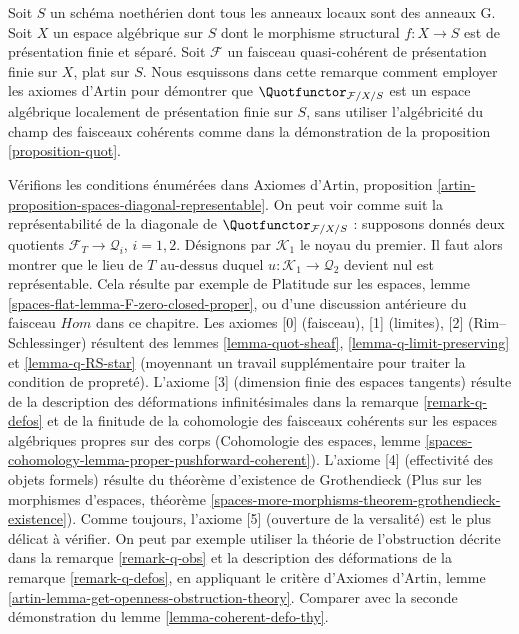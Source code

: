 \begin{remark}
\label{remark-quot-via-artins-axioms}
Soit $S$ un schéma noethérien dont tous les anneaux locaux sont des anneaux G.
Soit $X$ un espace algébrique sur $S$ dont le morphisme structural
$f : X \to S$ est de présentation finie et séparé. Soit $\mathcal{F}$ un
faisceau quasi-cohérent de présentation finie sur $X$, plat sur $S$. Nous
esquissons dans cette remarque comment employer les axiomes d'Artin pour
démontrer que $\Quotfunctor_{\mathcal{F}/X/S}$ est un espace algébrique
localement de présentation finie sur $S$, sans utiliser l'algébricité du champ
des faisceaux cohérents comme dans la démonstration de la proposition
\ref{proposition-quot}.

\medskip\noindent
Vérifions les conditions énumérées dans Axiomes d'Artin, proposition
\ref{artin-proposition-spaces-diagonal-representable}. On peut voir comme suit
la représentabilité de la diagonale de
$\Quotfunctor_{\mathcal{F}/X/S}$ : supposons donnés deux quotients
$\mathcal{F}_T \to \mathcal{Q}_i$, $i = 1, 2$. Désignons par
$\mathcal{K}_1$ le noyau du premier. Il faut alors montrer que le lieu de $T$
au-dessus duquel $u : \mathcal{K}_1 \to \mathcal{Q}_2$ devient nul est
représentable. Cela résulte par exemple de Platitude sur les espaces, lemme
\ref{spaces-flat-lemma-F-zero-closed-proper}, ou d'une discussion antérieure
du faisceau $\mathit{Hom}$ dans ce chapitre. Les axiomes [0] (faisceau), [1]
(limites), [2] (Rim--Schlessinger) résultent des lemmes
\ref{lemma-quot-sheaf}, \ref{lemma-q-limit-preserving} et
\ref{lemma-q-RS-star} (moyennant un travail supplémentaire pour traiter la
condition de propreté). L'axiome [3] (dimension finie des espaces tangents)
résulte de la description des déformations infinitésimales dans la remarque
\ref{remark-q-defos} et de la finitude de la cohomologie des faisceaux
cohérents sur les espaces algébriques propres sur des corps (Cohomologie des
espaces, lemme \ref{spaces-cohomology-lemma-proper-pushforward-coherent}).
L'axiome [4] (effectivité des objets formels) résulte du théorème d'existence
de Grothendieck (Plus sur les morphismes d'espaces, théorème
\ref{spaces-more-morphisms-theorem-grothendieck-existence}). Comme toujours,
l'axiome [5] (ouverture de la versalité) est le plus délicat à vérifier. On
peut par exemple utiliser la théorie de l'obstruction décrite dans la remarque
\ref{remark-q-obs} et la description des déformations de la remarque
\ref{remark-q-defos}, en appliquant le critère d'Axiomes d'Artin, lemme
\ref{artin-lemma-get-openness-obstruction-theory}. Comparer avec la seconde
démonstration du lemme \ref{lemma-coherent-defo-thy}.
\end{remark}









